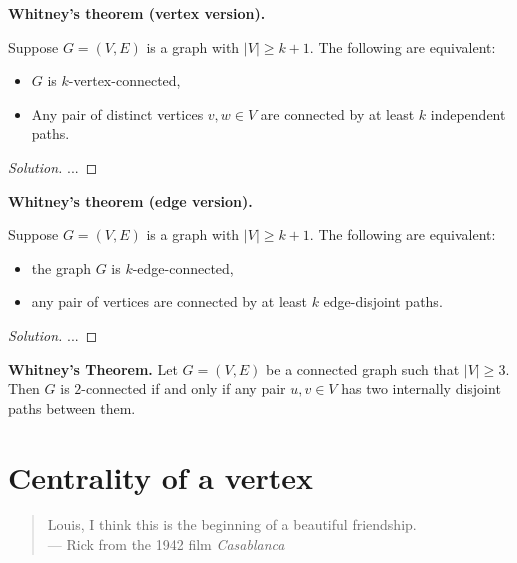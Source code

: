 \begin{theorem}
\textbf{Whitney's theorem (vertex version).}
{\rm
Suppose $G=(V,E)$ is a graph with $|V|\geq k+1$. The following are
equivalent:
\begin{itemize}
\item
$G$ is $k$-vertex-connected,
\item
Any pair of distinct vertices $v,w\in V$ are connected by
at least $k$ independent paths.
\end{itemize}
}
\end{theorem}

\begin{proof}[Solution]

...

\end{proof}



\begin{theorem}
\textbf{Whitney's theorem (edge version).}
{\rm
Suppose $G=(V,E)$ is a graph with $|V|\geq k+1$. The following are
equivalent:
\begin{itemize}
\item
the graph $G$ is $k$-edge-connected,

\item
any pair of
vertices are connected by at least $k$ edge-disjoint paths.
\end{itemize}
}
\end{theorem}

\begin{proof}[Solution]

...

\end{proof}


\begin{theorem}
\textbf{Whitney's Theorem.}
Let $G = (V, E)$ be a connected graph such that $|V| \geq 3$. Then $G$
is $2$-connected if and only if any pair $u,v \in V$ has two
internally disjoint paths between them.
\end{theorem}



\section{Centrality of a vertex}

\begin{quote}
\footnotesize
Louis, I think this is the beginning of a beautiful friendship. \\
\noindent
--- Rick from the 1942 film \emph{Casablanca}
\end{quote}

